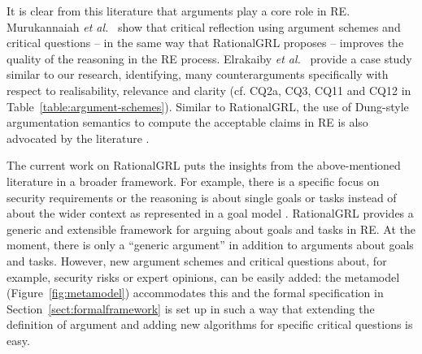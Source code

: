 It is clear from this literature that arguments play a core role in RE. Murukannaiah \emph{et al.}~\cite{murukannaiah2015} show that critical reflection using argument schemes and critical questions -- in the same way that RationalGRL proposes -- improves the quality of the reasoning in the RE process. Elrakaiby \emph{et al.}~\cite{ElrakaibyFSGN17} provide a case study similar to our research, identifying, many counterarguments specifically with respect to realisability, relevance and clarity (cf. CQ2a, CQ3, CQ11 and CQ12 in Table~\ref{table:argument-schemes}). Similar to RationalGRL, the use of Dung-style argumentation semantics to compute the acceptable claims in RE is also advocated by the literature \cite{yu2015automated,ionita2014argumentation,ElrakaibyFSGN17}. 

The current work on RationalGRL puts the insights from the above-mentioned literature in a broader framework. For example, there is a specific focus on security requirements \cite{haley2008security,yu2015automated,ionita2014argumentation} or the reasoning is about single goals or tasks instead of about the wider context as represented in a goal model \cite{haley2008security,yu2015automated,murukannaiah2015,ElrakaibyFSGN17}. RationalGRL provides a generic and extensible framework for arguing about goals and tasks in RE. At the moment, there is only a ``generic argument'' in addition to arguments about goals and tasks. However, new argument schemes and critical questions about, for example, security risks or expert opinions, can be easily added: the metamodel (Figure~\ref{fig:metamodel}) accommodates this and the formal specification in Section~\ref{sect:formalframework} is set up in such a way that extending the definition of argument and adding new algorithms for specific critical questions is easy. 

